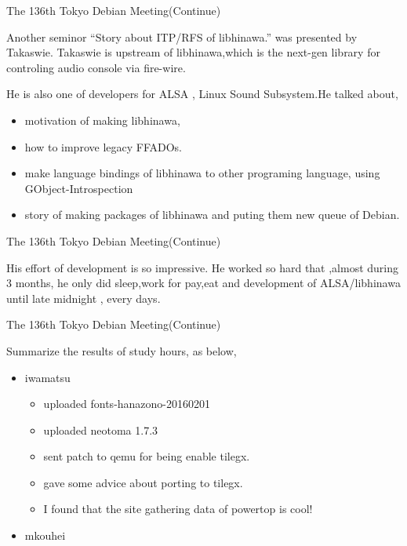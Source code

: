 \begin{frame}{The 136th Tokyo Debian Meeting(Continue)}

  Another seminor ``Story about ITP/RFS of libhinawa.'' was presented by Takaswie. Takaswie is upstream of libhinawa,which is the next-gen library for controling audio console via fire-wire.

  He is also one of developers for ALSA , Linux Sound Subsystem.He talked about,
  \begin{itemize}
  \item motivation of making libhinawa,
  \item how to improve legacy FFADOs.
  \item make language bindings of libhinawa to other programing language,
    using GObject-Introspection
  \item story of making packages of libhinawa and puting them new queue of Debian.
  \end{itemize}
\end{frame}
\begin{frame}{The 136th Tokyo Debian Meeting(Continue)}

  His effort of development is so impressive.
  He worked so hard that ,almost during 3 months, he only did sleep,work for pay,eat and development of ALSA/libhinawa until late midnight , every days.

\end{frame}

\begin{frame}{The 136th Tokyo Debian Meeting(Continue)}

 Summarize the results of study hours, as below,

\begin{itemize}
\item iwamatsu \\
  \begin{itemize}
   \item uploaded fonts-hanazono-20160201
   \item uploaded neotoma 1.7.3
   \item sent patch to qemu for being enable tilegx.
   \item gave some advice about porting to tilegx.
   \item I found that the site gathering data of powertop is cool!
  \end{itemize}
\item mkouhei\\
\end{itemize}
\end{frame}

